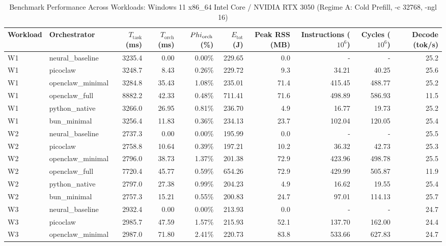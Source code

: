 \begin{table}[t]
\centering\small
\caption{Benchmark Performance Across Workloads: Windows 11 x86_64 Intel Core / NVIDIA RTX 3050 (Regime A: Cold Prefill, -c 32768, -ngl 16)}
\label{tab:Windows_master_summary}
\begin{tabular}{llrrrrrrrr}
\toprule
Workload & Orchestrator & $T_{\text{task}}$ (ms) & $T_{\text{orch}}$ (ms) & $\\Phi_{\text{orch}}$ (\%) & $E_{\text{tot}}$ (J) & Peak RSS (MB) & Instructions ($10^6$) & Cycles ($10^6$) & Decode (tok/s) \\
\midrule
W1 & neural\_baseline & 3235.4 & 0.00 & 0.00\% & 229.65 & 0.0 & - & - & 25.2 \\
W1 & picoclaw & 3248.7 & 8.43 & 0.26\% & 229.72 & 9.3 & 34.21 & 40.25 & 25.6 \\
W1 & openclaw\_minimal & 3284.8 & 35.43 & 1.08\% & 235.01 & 71.4 & 415.45 & 488.77 & 25.2 \\
W1 & openclaw\_full & 8882.2 & 42.33 & 0.48\% & 711.41 & 71.6 & 498.89 & 586.93 & 11.5 \\
W1 & python\_native & 3266.0 & 26.95 & 0.81\% & 236.70 & 4.9 & 16.77 & 19.73 & 25.2 \\
W1 & bun\_minimal & 3256.4 & 11.83 & 0.36\% & 234.13 & 23.7 & 102.04 & 120.05 & 25.4 \\
\midrule
W2 & neural\_baseline & 2737.3 & 0.00 & 0.00\% & 195.99 & 0.0 & - & - & 25.5 \\
W2 & picoclaw & 2758.8 & 10.64 & 0.39\% & 197.21 & 10.2 & 36.32 & 42.73 & 25.3 \\
W2 & openclaw\_minimal & 2796.0 & 38.73 & 1.37\% & 201.38 & 72.9 & 423.96 & 498.78 & 25.5 \\
W2 & openclaw\_full & 7720.4 & 45.77 & 0.59\% & 654.26 & 72.9 & 429.99 & 505.87 & 11.9 \\
W2 & python\_native & 2797.0 & 27.38 & 0.99\% & 204.23 & 4.9 & 16.62 & 19.55 & 25.4 \\
W2 & bun\_minimal & 2757.3 & 15.21 & 0.55\% & 200.83 & 24.7 & 97.01 & 114.13 & 25.7 \\
\midrule
W3 & neural\_baseline & 2932.4 & 0.00 & 0.00\% & 213.93 & 0.0 & - & - & 24.7 \\
W3 & picoclaw & 2985.7 & 47.59 & 1.57\% & 215.93 & 52.1 & 137.70 & 162.00 & 24.4 \\
W3 & openclaw\_minimal & 2987.0 & 71.80 & 2.41\% & 220.73 & 83.8 & 533.66 & 627.83 & 24.7 \\

\end{tabular}
\end{table}
